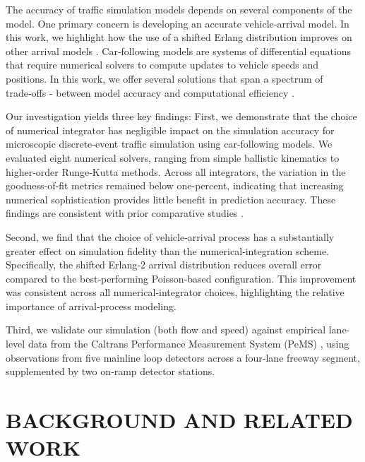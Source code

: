 \documentclass{scspaperproc}
\theoremstyle{scsthe}
\begin{document}
The accuracy of traffic simulation models depends on several components of the model.
One primary concern is developing an accurate vehicle‑arrival model. In this work, we highlight how the use of a shifted Erlang distribution improves on other arrival models \cite{cowan1975useful, li2017vehicle}.
Car‑following models are systems of differential equations that require numerical solvers to compute updates to vehicle speeds and positions. In this work, we offer several solutions that span a spectrum of trade‑offs - between model accuracy and computational efficiency \cite{treiber2015comparing, pvrikryl2017comparing}.

Our investigation yields three key findings:
First, we demonstrate that the choice of numerical integrator has negligible impact on the simulation accuracy for microscopic discrete‑event traffic simulation using car‑following models. We evaluated eight numerical solvers, ranging from simple ballistic kinematics to higher‑order Runge‑Kutta methods. Across all integrators, the variation in the goodness‑of‑fit metrics remained below one-percent, indicating that increasing numerical sophistication provides little benefit in prediction accuracy. These findings are consistent with prior comparative studies \cite{treiber2015comparing, pvrikryl2017comparing}.

Second, we find that the choice of vehicle‑arrival process has a substantially greater effect on simulation fidelity
than the numerical‑integration scheme. Specifically, the shifted Erlang‑2 arrival distribution reduces overall error compared to the best‑performing Poisson‑based configuration. This improvement was consistent across all numerical‑integrator choices, highlighting the relative importance of arrival‑process modeling.

Third, we validate our simulation (both flow and speed) against empirical lane-level data from the Caltrans Performance Measurement System (PeMS) \cite{caltran_pems}, using observations from five mainline loop detectors across a four‑lane freeway segment, supplemented by two on‑ramp detector stations.

\section{BACKGROUND AND RELATED WORK}
\label{sec:related}
\end{document}
